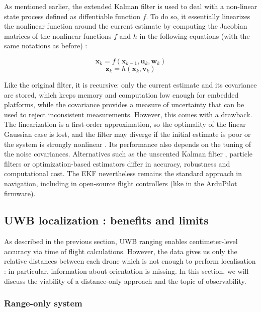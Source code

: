 As mentioned earlier, the extended Kalman filter is used to deal with a non-linear state process defined as diffentiable function $f$. To do so, it essentially linearizes the nonlinear function around the current estimate by computing the Jacobian matrices of the nonlinear functions $f$ and $h$ in the following equations (with the same notations as before) :

$$ {\displaystyle {\textbf {x}}_{k}=f({\textbf {x}}_{k-1},{\textbf {u}}_{k},{\textbf {w}}_{k})}$$
$${\displaystyle {\textbf {z}}_{k}=h({\textbf {x}}_{k},{\textbf {v}}_{k})}$$


Like the original filter, it is recursive: only the current estimate and its covariance are stored, which keeps memory and computation low enough for embedded platforms, while the covariance provides a measure of uncertainty that can be used to reject inconsistent measurements. However, this comes with a drawback. The linearization is a first-order approximation, so the optimality of the linear Gaussian case is lost, and the filter may diverge if the initial estimate is poor or the system is strongly nonlinear \parencite{boutayeb_convergence_1997}. Its performance also depends on the tuning of the noise covariances. Alternatives such as the unscented Kalman filter \parencite{julier_new_1997}, particle filters \parencite{arulampalam_tutorial_2002} or optimization-based estimators differ in accuracy, robustness and computational cost. The EKF nevertheless remains the standard approach in navigation, including in open-source flight controllers (like in the ArduPilot firmware).
\newpage

\subsection{UWB localization : benefits and limits }

As described in the previous section, UWB ranging enables centimeter-level accuracy via time of flight calculations. However, the data gives us only the relative distances between each drone which is not enough to perform localisation : in particular, information about orientation is missing. In this section, we will discuss the viability of a distance-only approach and the topic of observability.

\subsubsection{Range-only system}

